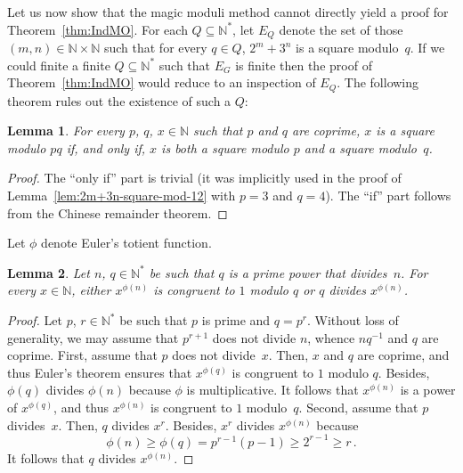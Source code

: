 \documentclass[12pt]{article}
\newcommand{\bZ}{\mathbb{Z}}
\newcommand{\bN}{\mathbb{N}} %
\newcommand{\bNast}{\bN^*}
\newtheorem{lemma}{Lemma}
\theoremstyle{definition}
\begin{document}
  Let us now show that 
  the magic moduli method cannot directly yield a proof for Theorem~\ref{thm:IndMO}.
  For each $Q \subseteq \bNast$,
  let $E_Q$ denote the set of those $(m, n) \in \bN \times \bN$ such that for every $q \in Q$,
  $2^m + 3^n$ is a square modulo~$q$.
  If we could finite a finite $Q \subseteq \bNast$ such that $E_G$ is finite
  then the proof of Theorem~\ref{thm:IndMO} would reduce to an inspection of $E_Q$.
  The following theorem rules out the existence of such a $Q$:

  \begin{lemma} \label{lem:square-mn-m-n}
   For every $p$, $q$, $x \in \bN$ such that $p$ and $q$ are coprime,
   $x$ is a square modulo $p q$
   if, and only if, $x$ is both a square modulo $p$ and a square modulo~$q$.
 \end{lemma}

 \begin{proof}
   The ``only if'' part is trivial
   (it was implicitly  used in the proof of Lemma~\ref{lem:2m+3n-square-mod-12} with $p = 3$ and $q = 4$).
   The ``if'' part follows from the Chinese remainder theorem.
 \end{proof} 

  Let $\phi$ denote Euler's totient function.

  \begin{lemma} \label{lem:Euler-0-or-1}
    Let $n$, $q \in \bNast$ be such that $q$ is a prime power that divides~$n$.
     For every $x \in \bN$, either $x^{\phi(n)}$ is congruent to $1$ modulo $q$ or $q$ divides $x^{\phi(n)}$.
  \end{lemma}

  \begin{proof}
    Let $p$, $r \in \bNast$ be such that $p$ is prime and $q = p^r$.
    Without loss of generality,
    we may assume that $p^{r + 1}$ does not divide $n$,
    whence $n q^{-1}$ and $q$ are coprime.
    First, assume that $p$ does not divide~$x$.
    Then, $x$ and $q$ are coprime,
    and thus Euler's theorem ensures that $x^{\phi(q)}$ is congruent to $1$ modulo $q$.
    Besides, $\phi(q)$ divides $\phi(n)$ because $\phi$ is multiplicative.
    It follows that $x^{\phi(n)}$ is a power of $x^{\phi(q)}$,
      and thus $x^{\phi(n)}$ is congruent to $1$ modulo~$q$.
    Second, assume that $p$ divides~$x$.
    Then, $q$ divides $x^r$.
    Besides, $x^r$ divides $x^{\phi(n)}$ because
    $$
    \phi(n) \ge \phi(q) = p^{r - 1} (p - 1) \ge 2^{r - 1} \ge r \,.
    $$
    It follows that $q$ divides $x^{\phi(n)}$.
\end{proof} 
\end{document}
